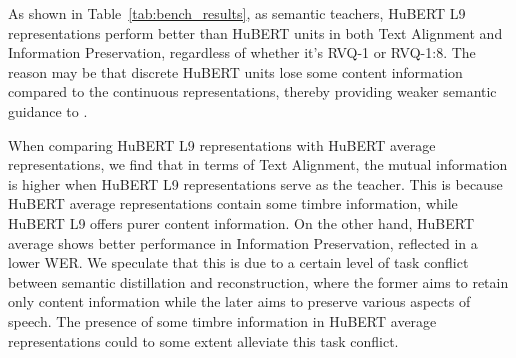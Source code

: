 % 

As shown in Table~\ref{tab:bench_results}, as semantic teachers, HuBERT L9 representations perform better than HuBERT units in both Text Alignment and Information Preservation, regardless of whether it's RVQ-1 or RVQ-1:8. The reason may be that discrete HuBERT units lose some content information compared to the continuous representations, thereby providing weaker semantic guidance to \method.

When comparing HuBERT L9 representations with HuBERT average representations, we find that in terms of Text Alignment, the mutual information is higher when HuBERT L9 representations serve as the teacher. This is because HuBERT average representations contain some timbre information, while HuBERT L9 offers purer content information. On the other hand, HuBERT average shows better performance in Information Preservation, reflected in a lower WER. We speculate that this is due to a certain level of task conflict between semantic distillation and reconstruction, where the former aims to retain only content information while the later aims to preserve various aspects of speech. The presence of some timbre information in HuBERT average representations could to some extent alleviate this task conflict.
